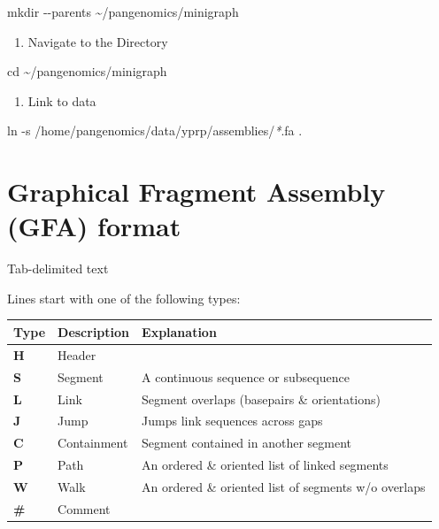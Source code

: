 \documentclass[
]{book}
\newenvironment{Shaded}{\begin{snugshade}}{\end{snugshade}}
\newcommand{\AttributeTok}[1]{\textcolor[rgb]{0.77,0.63,0.00}{#1}}
\newcommand{\BuiltInTok}[1]{#1}
\newcommand{\FunctionTok}[1]{\textcolor[rgb]{0.00,0.00,0.00}{#1}}
\newcommand{\NormalTok}[1]{#1}
\newcommand{\PreprocessorTok}[1]{\textcolor[rgb]{0.56,0.35,0.01}{\textit{#1}}}
\providecommand{\tightlist}{%
  \setlength{\itemsep}{0pt}\setlength{\parskip}{0pt}}
\begin{document}
\begin{Shaded}
\begin{Highlighting}[]
\FunctionTok{mkdir} \AttributeTok{{-}{-}parents}\NormalTok{ \textasciitilde{}/pangenomics/minigraph}
\end{Highlighting}
\end{Shaded}

\begin{enumerate}
\def\labelenumi{\arabic{enumi}.}
\setcounter{enumi}{2}
\tightlist
\item
  Navigate to the Directory
\end{enumerate}

\begin{Shaded}
\begin{Highlighting}[]
\BuiltInTok{cd}\NormalTok{ \textasciitilde{}/pangenomics/minigraph}
\end{Highlighting}
\end{Shaded}

\begin{enumerate}
\def\labelenumi{\arabic{enumi}.}
\setcounter{enumi}{3}
\tightlist
\item
  Link to data
\end{enumerate}

\begin{Shaded}
\begin{Highlighting}[]
\FunctionTok{ln} \AttributeTok{{-}s}\NormalTok{ /home/pangenomics/data/yprp/assemblies/}\PreprocessorTok{*}\NormalTok{.fa .}
\end{Highlighting}
\end{Shaded}

\hypertarget{graphical-fragment-assembly-gfa-format}{%
\section{Graphical Fragment Assembly (GFA) format}\label{graphical-fragment-assembly-gfa-format}}

Tab-delimited text

Lines start with one of the following types:

\begin{longtable}[]{@{}lll@{}}
\toprule()
Type & Description & Explanation \\
\midrule()
\endhead
\textbf{H} & Header & \\
\textbf{S} & Segment & A continuous sequence or subsequence \\
\textbf{L} & Link & Segment overlaps (basepairs \& orientations) \\
\textbf{J} & Jump & Jumps link sequences across gaps \\
\textbf{C} & Containment & Segment contained in another segment \\
\textbf{P} & Path & An ordered \& oriented list of linked segments \\
\textbf{W} & Walk & An ordered \& oriented list of segments w/o overlaps \\
\textbf{\#} & Comment & \\
\bottomrule()
\end{longtable}
\end{document}
